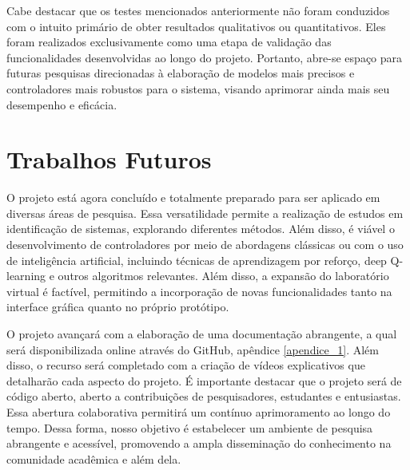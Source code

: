 Cabe destacar que os testes mencionados anteriormente não foram conduzidos com o intuito primário de obter resultados qualitativos ou quantitativos. Eles foram realizados exclusivamente como uma etapa de validação das funcionalidades desenvolvidas ao longo do projeto. Portanto, abre-se espaço para futuras pesquisas direcionadas à elaboração de modelos mais precisos e controladores mais robustos para o sistema, visando aprimorar ainda mais seu desempenho e eficácia.

\section{Trabalhos Futuros}
\label{trabalhos_futuros}

O projeto está agora concluído e totalmente preparado para ser aplicado em diversas áreas de pesquisa. Essa versatilidade permite a realização de estudos em identificação de sistemas, explorando diferentes métodos. Além disso, é viável o desenvolvimento de controladores por meio de abordagens clássicas ou com o uso de inteligência artificial, incluindo técnicas de aprendizagem por reforço, deep Q-learning e outros algoritmos relevantes. Além disso, a expansão do laboratório virtual é factível, permitindo a incorporação de novas funcionalidades tanto na interface gráfica quanto no próprio protótipo.

O projeto avançará com a elaboração de uma documentação abrangente, a qual será disponibilizada online através do GitHub, apêndice \ref{apendice_1}. Além disso, o recurso será completado com a criação de vídeos explicativos que detalharão cada aspecto do projeto. É importante destacar que o projeto será de código aberto, aberto a contribuições de pesquisadores, estudantes e entusiastas. Essa abertura colaborativa permitirá um contínuo aprimoramento ao longo do tempo. Dessa forma, nosso objetivo é estabelecer um ambiente de pesquisa abrangente e acessível, promovendo a ampla disseminação do conhecimento na comunidade acadêmica e além dela.
